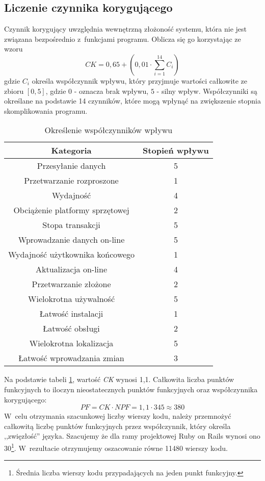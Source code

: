 \documentclass[12pt,leqno,twoside]{mwart}
\begin{document}
\subsection{Liczenie czynnika korygującego}
\noindent Czynnik korygujący uwzględnia wewnętrzną złożoność systemu, która nie jest związana bezpośrednio z~funkcjami programu. Oblicza się go korzystając ze wzoru
\begin{displaymath}
CK = 0,65 + (0,01 \cdot \sum_{i=1}^{14} C_i)
\end{displaymath}
gdzie $C_i$ określa współczynnik wpływu, który przyjmuje wartości całkowite ze zbioru $[0,5]$, gdzie $0$ - oznacza brak wpływu, $5$ - silny wpływ. Współczynniki są określane na podstawie 14 czynników, które mogą wpłynąć na zwiększenie stopnia skomplikowania programu.
\begin{table}[h]
	\centering
	\caption{Określenie współczynników wpływu}
		\rule{0pt}{3ex}
		\begin{tabular}{|c|c|}
		\hline
		\textbf{Kategoria}				& \textbf{Stopień wpływu} \\ \hline
		Przesyłanie danych 				& 5\\ \hline
		Przetwarzanie rozproszone 		& 1\\ \hline
		Wydajność 						& 4\\ \hline
		Obciążenie platformy sprzętowej & 2\\ \hline
		Stopa transakcji 				& 5\\ \hline
		Wprowadzanie danych on-line 	& 5\\ \hline
		Wydajność użytkownika końcowego & 1\\ \hline
		Aktualizacja on-line 			& 4\\ \hline
		Przetwarzanie złożone 			& 2\\ \hline
		Wielokrotna używalność 			& 5\\ \hline
		Łatwość instalacji 				& 1\\ \hline
		Łatwość obsługi					& 2\\ \hline
		Wielokrotna lokalizacja 		& 5\\ \hline
		Łatwość wprowadzania zmian 		& 3\\ \hline
		\end{tabular}
	\label{wsp_wplywu}
\end{table}

Na podstawie tabeli \ref{wsp_wplywu}, wartość \textit{CK} wynosi 1,1. Całkowita liczba punktów funkcyjnych to iloczyn nieostatecznych punktów funkcyjnych oraz współczynnika korygującego:
\begin{displaymath}
PF = CK \cdot NPF = 1,1 \cdot 345 \approx 380
\end{displaymath}
W~celu otrzymania szacunkowej liczby wierszy kodu, należy przemnożyć całkowitą liczbę punktów funkcyjnych przez współczynnik, który określa ,,zwięzłość'' języka. Szacujemy że dla ramy projektowej Ruby on Rails wynosi ono 30\footnote{Średnia liczba wierszy kodu przypadających na jeden punkt funkcyjny.}. W~rezultacie otrzymujemy oszacowanie równe 11480 wierszy kodu.
\end{document}
